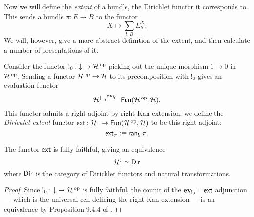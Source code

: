 Now we will define the \emph{extent} of a bundle, the Dirichlet functor it
corresponds to. This sends a bundle
$\pi : E \to B$ to the functor
$$X \mapsto \sum_{b : B} E_b^X.$$
We will, however, give a more abstract definition of the extent, and then
calculate a number of presentations of it.

\begin{defn}
Consider the functor $!_0 : \down \to \Ha\op$ picking out the unique morphism $1\to 0$ in $\Ha\op$. Sending a functor $\Ha\op\to\Ha$ to its precomposition with $!_0$ gives an evaluation functor
  $$\Ha^{\down} \xleftarrow{\ev_{!_0}} \Fun(\Ha\op, \Ha).$$
  This functor admits a right adjoint by right Kan extension; we define the
  \emph{Dirichlet extent} functor $\ext : \Ha^{\down} \to \Fun(\Ha\op,
  \Ha)$ to be this right adjoint:
  $$\ext_{\pi} :\equiv \term{ran}_{!_0} \pi.$$
\end{defn}

\begin{prop}
  The functor $\ext$ is fully faithful, giving an equivalence 
  $$\Ha^{\down} \simeq \Dir$$
  where $\Dir$ is the category of Dirichlet functors and natural transformations.
\end{prop}
\begin{proof}
Since $!_0 : \down \to \Ha\op$ is fully faithful, the counit of the
$\ev_{!_0} \vdash \ext$ adjunction --- which is the universal cell defining the
right Kan extension --- is an equivalence by Proposition 9.4.4 of \cite{RV:Elements}. 
\end{proof}


